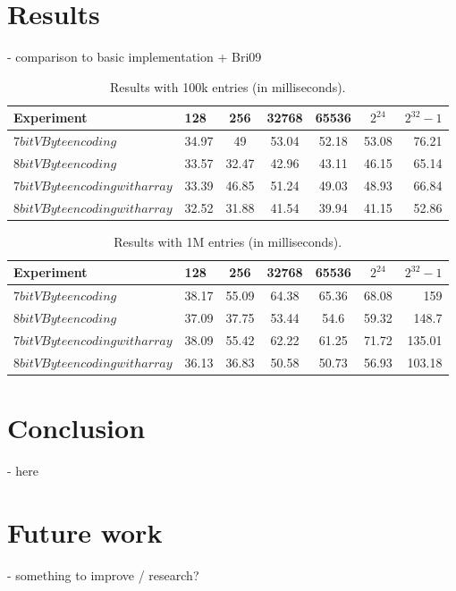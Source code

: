 \chapter{Results}
 - comparison to basic implementation + Bri09
\begin{table}
\centering
\caption{Results with 100k entries (in milliseconds).\label{table:results}}
\begin{tabular}{l||l c c c c r} 
Experiment & 128 & 256 & 32768 & 65536 & $2^{24}$ & $2^{32} -1$\\ 
\hline \hline 
$7bit VByte encoding$ & 34.97 & 49 & 53.04 & 52.18 & 53.08 & 76.21\\
$8bit VByte encoding$ & 33.57 & 32.47 & 42.96 & 43.11 & 46.15 & 65.14\\
$7bit VByte encoding with array$ & 33.39 & 46.85 & 51.24 & 49.03 & 48.93 & 66.84 \\
$8bit VByte encoding with array$ & 32.52 & 31.88 & 41.54 & 39.94 & 41.15 & 52.86 \\

\hline
%
\end{tabular}
\end{table}

\begin{table}
\centering
\caption{Results with 1M entries (in milliseconds).\label{table:results}}
\begin{tabular}{l||l c c c c r} 
Experiment & 128 & 256 & 32768 & 65536 & $2^{24}$ & $2^{32} -1$ \\ 
\hline \hline 
$7bit VByte encoding$ & 38.17 & 55.09 & 64.38 & 65.36 & 68.08 & 159 \\
$8bit VByte encoding$ & 37.09 & 37.75 & 53.44 & 54.6 & 59.32 & 148.7\\
$7bit VByte encoding with array$ & 38.09 & 55.42 & 62.22 & 61.25 & 71.72 & 135.01\\
$8bit VByte encoding with array$ & 36.13 & 36.83 & 50.58 & 50.73 & 56.93 & 103.18\\

\hline
%
\end{tabular}
\end{table}

\chapter{Conclusion}
 - here

\chapter{Future work}
 - something to improve / research?


